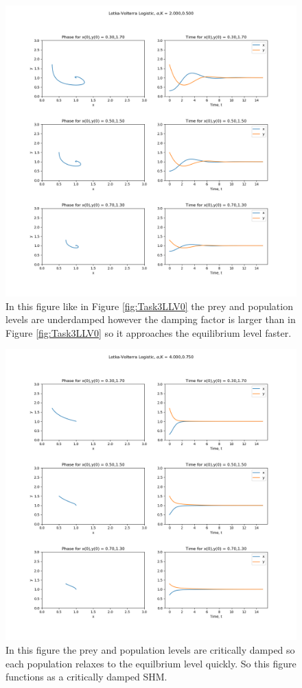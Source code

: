 \documentclass[11pt,a4paper]{CLabBookTemplate} %
\begin{document}
\begin{figure}[h!]
	\centering
	\includegraphics[width = 160mm]{Figures/Task3LLV1.png}
	\caption{In this figure like in Figure \ref{fig:Task3LLV0} the prey and population levels are underdamped however the damping factor is larger than in Figure \ref{fig:Task3LLV0} so it approaches the equilibrium level faster.}
	\label{fig:Task3LLV1}
\end{figure}
\begin{figure}[h!]
	\centering
	\includegraphics[width = 160mm]{Figures/Task3LLV2.png}
	\caption{In this figure the prey and population levels are critically damped so each population relaxes to the equilbrium level quickly. So this figure functions as a critically damped SHM.}
	\label{fig:Task3LLV2}
\end{figure}
\end{document}
